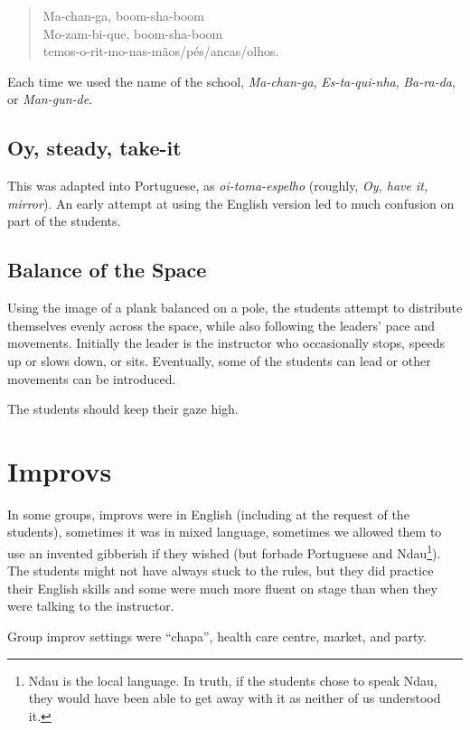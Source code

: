 \documentclass[article,twoside]{memoir}
\begin{document}
\begin{verse}
Ma-chan-ga, boom-sha-boom\\
Mo-zam-bi-que, boom-sha-boom\\
temos-o-rit-mo-nas-mãos/pés/ancas/olhos.
\end{verse}

Each time we used the name of the school, \textit{Ma-chan-ga},
\textit{Es-ta-qui-nha}, \textit{Ba-ra-da}, or \textit{Man-gun-de}.

\subsection{Oy, steady, take-it}
This was adapted into Portuguese, as \textit{oi-toma-espelho} (roughly,
\textit{Oy, have it, mirror}). An early attempt at using the English version
led to much confusion on part of the students.

\subsection{Balance of the Space}
Using the image of a plank balanced on a pole, the students attempt to
distribute themselves evenly across the space, while also following the
leaders' pace and movements. Initially the leader is the instructor who
occasionally stops, speeds up or slows down, or sits. Eventually, some of the
students can lead or other movements can be introduced.

The students should keep their gaze high.

\section{Improvs}

In some groups, improvs were in English (including at the request of the
students), sometimes it was in mixed language, sometimes we allowed them to use
an invented gibberish if they wished (but forbade Portuguese and
Ndau\footnote{Ndau is the local language. In truth, if the students chose to
speak Ndau, they would have been able to get away with it as neither of us
understood it.}). The students might not have always stuck to the rules, but
they did practice their English skills and some were much more fluent on stage
than when they were talking to the instructor.

Group improv settings were ``chapa'', health care centre, market, and party.
\end{document}
